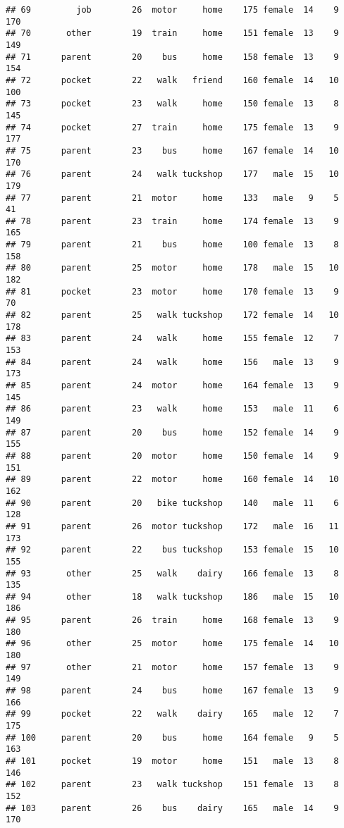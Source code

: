 \documentclass[
]{article}
\begin{document}
\begin{verbatim}
## 69         job        26  motor     home    175 female  14    9     170
## 70       other        19  train     home    151 female  13    9     149
## 71      parent        20    bus     home    158 female  13    9     154
## 72      pocket        22   walk   friend    160 female  14   10     100
## 73      pocket        23   walk     home    150 female  13    8     145
## 74      pocket        27  train     home    175 female  13    9     177
## 75      parent        23    bus     home    167 female  14   10     170
## 76      parent        24   walk tuckshop    177   male  15   10     179
## 77      parent        21  motor     home    133   male   9    5      41
## 78      parent        23  train     home    174 female  13    9     165
## 79      parent        21    bus     home    100 female  13    8     158
## 80      parent        25  motor     home    178   male  15   10     182
## 81      pocket        23  motor     home    170 female  13    9      70
## 82      parent        25   walk tuckshop    172 female  14   10     178
## 83      parent        24   walk     home    155 female  12    7     153
## 84      parent        24   walk     home    156   male  13    9     173
## 85      parent        24  motor     home    164 female  13    9     145
## 86      parent        23   walk     home    153   male  11    6     149
## 87      parent        20    bus     home    152 female  14    9     155
## 88      parent        20  motor     home    150 female  14    9     151
## 89      parent        22  motor     home    160 female  14   10     162
## 90      parent        20   bike tuckshop    140   male  11    6     128
## 91      parent        26  motor tuckshop    172   male  16   11     173
## 92      parent        22    bus tuckshop    153 female  15   10     155
## 93       other        25   walk    dairy    166 female  13    8     135
## 94       other        18   walk tuckshop    186   male  15   10     186
## 95      parent        26  train     home    168 female  13    9     180
## 96       other        25  motor     home    175 female  14   10     180
## 97       other        21  motor     home    157 female  13    9     149
## 98      parent        24    bus     home    167 female  13    9     166
## 99      pocket        22   walk    dairy    165   male  12    7     175
## 100     parent        20    bus     home    164 female   9    5     163
## 101     pocket        19  motor     home    151   male  13    8     146
## 102     parent        23   walk tuckshop    151 female  13    8     152
## 103     parent        26    bus    dairy    165   male  14    9     170

\end{verbatim}
\end{document}
